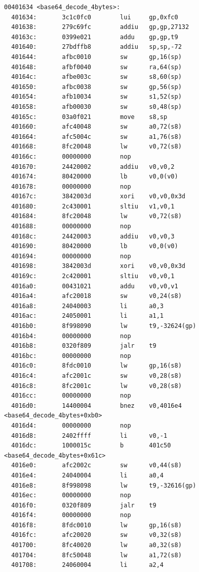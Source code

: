 \documentclass[11pt]{article}
\begin{document}
\begin{verbatim}
00401634 <base64_decode_4bytes>:
  401634:       3c1c0fc0        lui     gp,0xfc0
  401638:       279c69fc        addiu   gp,gp,27132
  40163c:       0399e021        addu    gp,gp,t9
  401640:       27bdffb8        addiu   sp,sp,-72
  401644:       afbc0010        sw      gp,16(sp)
  401648:       afbf0040        sw      ra,64(sp)
  40164c:       afbe003c        sw      s8,60(sp)
  401650:       afbc0038        sw      gp,56(sp)
  401654:       afb10034        sw      s1,52(sp)
  401658:       afb00030        sw      s0,48(sp)
  40165c:       03a0f021        move    s8,sp
  401660:       afc40048        sw      a0,72(s8)
  401664:       afc5004c        sw      a1,76(s8)
  401668:       8fc20048        lw      v0,72(s8)
  40166c:       00000000        nop
  401670:       24420002        addiu   v0,v0,2
  401674:       80420000        lb      v0,0(v0)
  401678:       00000000        nop
  40167c:       3842003d        xori    v0,v0,0x3d
  401680:       2c430001        sltiu   v1,v0,1
  401684:       8fc20048        lw      v0,72(s8)
  401688:       00000000        nop
  40168c:       24420003        addiu   v0,v0,3
  401690:       80420000        lb      v0,0(v0)
  401694:       00000000        nop
  401698:       3842003d        xori    v0,v0,0x3d
  40169c:       2c420001        sltiu   v0,v0,1
  4016a0:       00431021        addu    v0,v0,v1
  4016a4:       afc20018        sw      v0,24(s8)
  4016a8:       24040003        li      a0,3
  4016ac:       24050001        li      a1,1
  4016b0:       8f998090        lw      t9,-32624(gp)
  4016b4:       00000000        nop
  4016b8:       0320f809        jalr    t9
  4016bc:       00000000        nop
  4016c0:       8fdc0010        lw      gp,16(s8)
  4016c4:       afc2001c        sw      v0,28(s8)
  4016c8:       8fc2001c        lw      v0,28(s8)
  4016cc:       00000000        nop
  4016d0:       14400004        bnez    v0,4016e4 <base64_decode_4bytes+0xb0>
  4016d4:       00000000        nop
  4016d8:       2402ffff        li      v0,-1
  4016dc:       1000015c        b       401c50 <base64_decode_4bytes+0x61c>
  4016e0:       afc2002c        sw      v0,44(s8)
  4016e4:       24040004        li      a0,4
  4016e8:       8f998098        lw      t9,-32616(gp)
  4016ec:       00000000        nop
  4016f0:       0320f809        jalr    t9
  4016f4:       00000000        nop
  4016f8:       8fdc0010        lw      gp,16(s8)
  4016fc:       afc20020        sw      v0,32(s8)
  401700:       8fc40020        lw      a0,32(s8)
  401704:       8fc50048        lw      a1,72(s8)
  401708:       24060004        li      a2,4

\end{verbatim}
\end{document}
